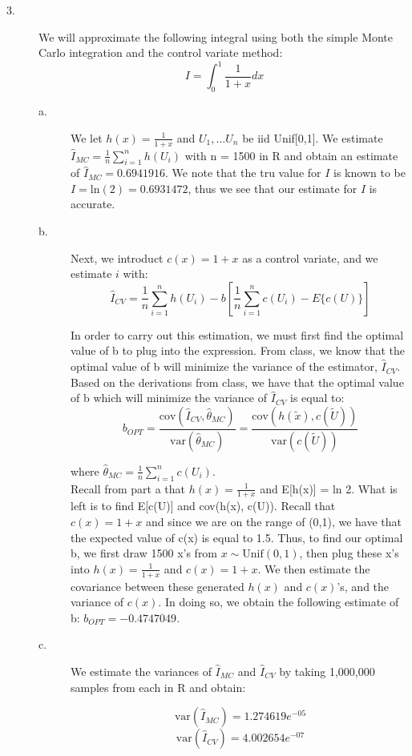\documentclass[12pt]{article}
\begin{document}
\begin{description}
\item[3.] We will approximate the following integral using both the simple Monte Carlo integration and the control variate method:
\[I = \int_0^1 \frac{1}{1 + x} dx\]

\begin{description}
\item[a.]We let $h(x) = \frac{1}{1+x}$ and $U_1, \dots U_n$ be iid Unif[0,1]. We estimate $\hat{I}_{MC} = \frac{1}{n} \sum_{i = 1}^n h(U_i)$ with n = 1500 in R and obtain an estimate of $\hat{I}_{MC} = 0.6941916$. We note that the tru value for $I$ is known to be $I = \mathrm{ln}(2) = 0.6931472$, thus we see that our estimate for $I$ is accurate. 
\item[b.] Next, we introduct $c(x) = 1 + x$ as a control variate, and we estimate $i$ with:
\[\hat{I}_{CV} = \frac{1}{n} \sum_{i = 1}^n h(U_i) - b \left[ \frac{1}{n} \sum_{i = 1}^n c(U_i) - E\{c(U)\} \right]\]

In order to carry out this estimation, we must first find the optimal value of b to plug into the expression. From class, we know that the optimal value of b will minimize the variance of the estimator, $\hat{I}_{CV}$. Based on the derivations from class, we have that the optimal value of b which will minimize the variance of  $\hat{I}_{CV}$ is equal to:
\[b_{OPT} = \frac{\mathrm{cov}(\hat{I}_{CV}, \hat{\theta}_{MC})}{\mathrm{var}(\hat{\theta}_{MC})} = \frac{\mathrm{cov}(h(\tilde{x}), c(\tilde{U}))}{\mathrm{var}(c(\tilde{U}))} \]

where $\hat{\theta}_{MC} = \frac{1}{n} \sum_{i = 1}^n c(U_i)$.\\

Recall from part a that $h(x)  = \frac{1}{1 + x}$ and E[h(x)] = ln 2. What is left is to find E[c(U)] and cov(h(x), c(U)). Recall that $c(x) = 1 + x$ and since we are on the range of (0,1), we have that the expected value of c(x) is equal to 1.5. Thus, to find our optimal b, we first draw 1500 x's from $x \sim \mathrm{Unif}(0, 1)$, then plug these x's into $h(x) = \frac{1}{1 + x}$ and $c(x) = 1 + x$. We then estimate the covariance between these generated $h(x)$ and $c(x)$'s, and the variance of $c(x)$. In doing so, we obtain the following estimate of b: $b_{OPT} = -0.4747049$. 

\item[c.] We estimate the variances of $\hat{I}_{MC}$ and $\hat{I}_{CV}$ by taking 1,000,000 samples from each in R and obtain:

 \[\mathrm{var}(\hat{I}_{MC}) = 1.274619e^{-05}\] 
\[\mathrm{var}(\hat{I}_{CV}) = 4.002654e^{-07}\]


\end{description}
\end{description}
\end{document}

